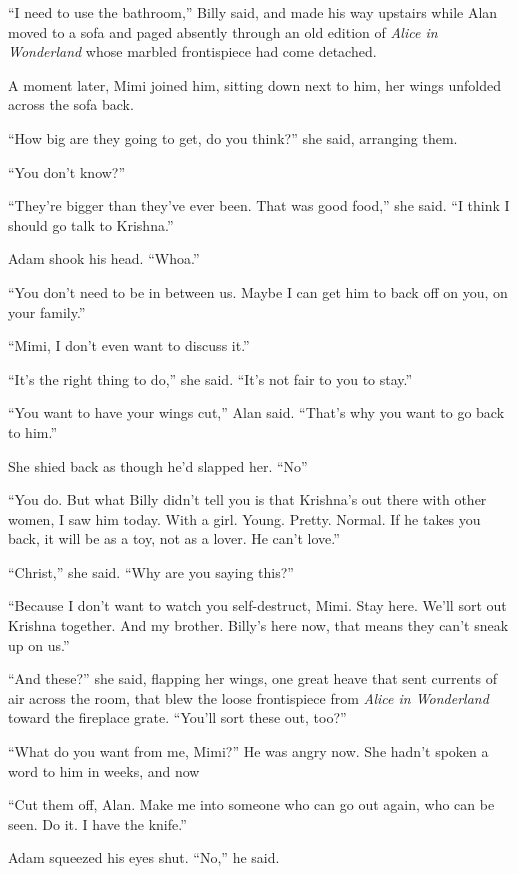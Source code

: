 ``I need to use the bathroom,'' Billy said, and made his way upstairs
while Alan moved to a sofa and paged absently through an old edition
of \textit{Alice in Wonderland} whose marbled frontispiece had come
detached. 

A moment later, Mimi joined him, sitting down next to him, her wings
unfolded across the sofa back.

``How big are they going to get, do you think?'' she said, arranging
them.

``You don't know?''

``They're bigger than they've ever been.  That was good food,'' she
said.  ``I think I should go talk to Krishna.''

Adam shook his head.  ``Whoa.''

``You don't need to be in between us.  Maybe I can get him to back off
on you, on your family.''

``Mimi, I don't even want to discuss it.''

``It's the right thing to do,'' she said.  ``It's not fair to you to
stay.''

``You want to have your wings cut,'' Alan said.  ``That's why you want
to go back to him.''

She shied back as though he'd slapped her.  ``No\dash{}''

``You do.  But what Billy didn't tell you is that Krishna's out there
with other women, I saw him today.  With a girl.  Young.  Pretty. 
Normal.  If he takes you back, it will be as a toy, not as a lover. 
He can't love.''

``Christ,'' she said.  ``Why are you saying this?''

``Because I don't want to watch you self-destruct, Mimi.  Stay here. 
We'll sort out Krishna together.  And my brother.  Billy's here now,
that means they can't sneak up on us.''

``And these?'' she said, flapping her wings, one great heave that sent
currents of air across the room, that blew the loose frontispiece from
\textit{Alice in Wonderland} toward the fireplace grate.  ``You'll
sort these out, too?''

``What do you want from me, Mimi?'' He was angry now.  She hadn't
spoken a word to him in weeks, and now\dash{}

``Cut them off, Alan.  Make me into someone who can go out again, who
can be seen.  Do it.  I have the knife.''

Adam squeezed his eyes shut.  ``No,'' he said. 

